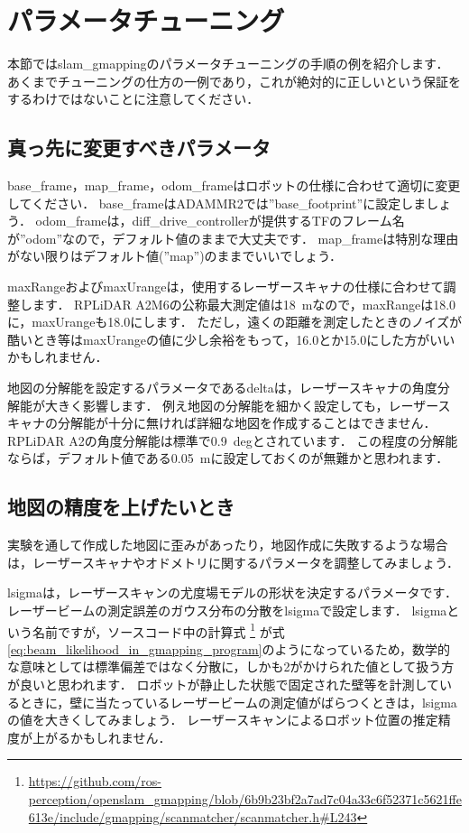 \documentclass[{../../master}]{subfiles}
\begin{document}
\section{パラメータチューニング}
\label{sec:gmapping_tuning}

本節では\textsf{slam\_gmapping}のパラメータチューニングの手順の例を紹介します．
あくまでチューニングの仕方の一例であり，これが絶対的に正しいという保証をするわけではないことに注意してください．

\subsection{真っ先に変更すべきパラメータ}

\textsf{base\_frame}，\textsf{map\_frame}，\textsf{odom\_frame}はロボットの仕様に合わせて適切に変更してください．
\textsf{base\_frame}はADAMMR2では\textsf{''base\_footprint''}に設定しましょう．
\textsf{odom\_frame}は，\textsf{diff\_drive\_controller}が提供するTFのフレーム名が\textsf{''odom''}なので，デフォルト値のままで大丈夫です．
\textsf{map\_frame}は特別な理由がない限りはデフォルト値(\textsf{''map''})のままでいいでしょう．

\textsf{maxRange}および\textsf{maxUrange}は，使用するレーザースキャナの仕様に合わせて調整します．
RPLiDAR A2M6の公称最大測定値は\SI{18}{m}なので，\textsf{maxRange}は18.0に，\textsf{maxUrange}も18.0にします．
ただし，遠くの距離を測定したときのノイズが酷いとき等は\textsf{maxUrange}の値に少し余裕をもって，16.0とか15.0にした方がいいかもしれません．

地図の分解能を設定するパラメータである\textsf{delta}は，レーザースキャナの角度分解能が大きく影響します．
例え地図の分解能を細かく設定しても，レーザースキャナの分解能が十分に無ければ詳細な地図を作成することはできません．
RPLiDAR A2の角度分解能は標準で\SI{0.9}{deg}とされています．
この程度の分解能ならば，デフォルト値である\SI{0.05}{m}に設定しておくのが無難かと思われます．

\subsection{地図の精度を上げたいとき}

実験を通して作成した地図に歪みがあったり，地図作成に失敗するような場合は，レーザースキャナやオドメトリに関するパラメータを調整してみましょう．

\textsf{lsigma}は，レーザースキャンの尤度場モデルの形状を決定するパラメータです．
レーザービームの測定誤差のガウス分布の分散を\textsf{lsigma}で設定します．
\textsf{lsigma}という名前ですが，ソースコード中の計算式
\footnote{\url{https://github.com/ros-perception/openslam_gmapping/blob/6b9b23bf2a7ad7c04a33c6f52371c5621ffe613e/include/gmapping/scanmatcher/scanmatcher.h\#L243}}
が式\ref{eq:beam_likelihood_in_gmapping_program}のようになっているため，数学的な意味としては標準偏差ではなく分散に，しかも2がかけられた値として扱う方が良いと思われます．
ロボットが静止した状態で固定された壁等を計測しているときに，壁に当たっているレーザービームの測定値がばらつくときは，\textsf{lsigma}の値を大きくしてみましょう．
レーザースキャンによるロボット位置の推定精度が上がるかもしれません．
\end{document}
